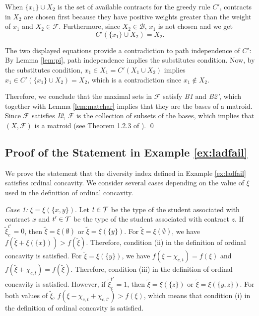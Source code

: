 \documentclass[12pt]{amsart}
\theoremstyle{remark}
\begin{document}
When $\{x_1\} \cup X_2$ is the set of available contracts for the greedy rule $C'$,
contracts in $X_2$ are chosen first because they have positive weights greater
than the weight of $x_1$ and $X_2 \in \mathcal{F}$. Furthermore, since
$X_2\in \mathcal{B}$, $x_1$ is not chosen and we get
\[C'(\{x_1\} \cup X_2)=X_2.\]

The two displayed equations provide a contradiction to path independence of $C'$: By
Lemma \ref{lem:pi}, path independence implies the substitutes condition. Now, by
the substitutes condition, $x_1\in X_1=C'(X_1\cup X_2)$ implies $x_1\in C'(\{x_1\}\cup X_2)=X_2$, which is a contradiction since $x_1\notin X_2$.

Therefore, we conclude that the maximal sets in $\mathcal{F}$ satisfy \emph{B1} and \emph{B2'},
which together with Lemma \ref{lem:matchar} implies that they are the bases of a matroid. Since $\mathcal{F}$ satisfies \emph{I2}, $\mathcal{F}$ is the collection of subsets of the bases, which implies that $(X,\mathcal{F})$ is a matroid (see Theorem 1.2.3 of \cite{oxley}).
%
%
\qed
\bigskip


\subsection*{Proof of the Statement in Example \ref{ex:ladfail}}
We prove the statement that the diversity index defined in Example \ref{ex:ladfail}
satisfies ordinal concavity. We consider several cases depending on the value of $\xi$ used in the definition of ordinal concavity.


\medskip
\noindent
\emph{Case 1:} $\xi=\xi(\{x,y\})$. Let $t\in \mathcal{T}$ be the type of the student
associated with contract $x$ and $t'\in \mathcal{T}$ be the type of the student
associated with contract $z$.
If $\tilde{\xi}_{c}^{t'}=0$, then $\tilde{\xi}=\xi(\emptyset)$
or $\tilde{\xi}=\xi(\{y\})$. For $\tilde \xi=\xi(\emptyset)$, we have
$f(\tilde \xi + \xi(\{x\}))>f(\tilde \xi)$. Therefore, condition (ii) in the definition of ordinal concavity is satisfied. For $\tilde \xi=\xi(\{y\})$, we have $f(\xi-\chi_{c,t})=f(\xi)$ and $f(\tilde \xi+\chi_{c,t})=f(\tilde \xi)$. Therefore, condition (iii) in the definition of ordinal concavity is satisfied. However, if $\tilde{\xi}_{c}^{t'}=1$,
then $\tilde{\xi}=\xi(\{z\})$ or $\tilde{\xi}=\xi(\{y,z\})$. For both values of
$\tilde \xi$, $f(\xi-\chi_{c,t}+\chi_{c,t'})>f(\xi)$, which means that
condition (i) in the definition of ordinal concavity is satisfied.
\end{document}
